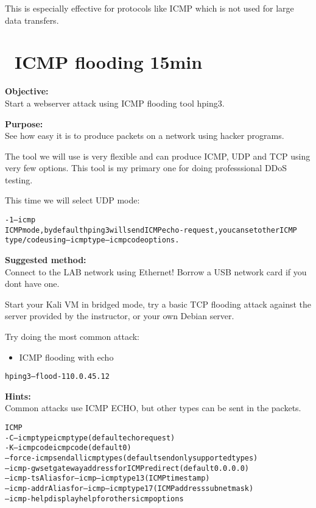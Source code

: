 \documentclass[a4paper,11pt,notitlepage]{report}
\begin{document}
This is especially effective for protocols like ICMP which is not used for large data transfers.

\chapter{\faInfoCircle\ ICMP flooding 15min}

{\bf Objective:}\\
Start a webserver attack using ICMP flooding tool hping3.

{\bf Purpose:}\\
See how easy it is to produce packets on a network using hacker programs.

The tool we will use is very flexible and can produce ICMP, UDP and TCP using very few options. This tool is my primary one for doing professsional DDoS testing.

This time we will select UDP mode:

\begin{alltt}\footnotesize
-1 --icmp
       ICMP  mode,  by  default  hping3  will  send  ICMP echo-request, you can set other ICMP
       type/code using --icmptype --icmpcode options.
\end{alltt}

{\bf Suggested method:}\\
Connect to the LAB network using Ethernet! Borrow a USB network card if you dont have one.

Start your Kali VM in bridged mode, try a basic TCP flooding attack against the server provided by the instructor, or your own Debian server.

Try doing the most common attack:
\begin{itemize}
\item ICMP flooding with echo
\end{itemize}

\begin{alltt}\footnotesize
hping3 --flood -1 10.0.45.12
\end{alltt}





{\bf Hints:}\\
Common attacks use ICMP ECHO, but other types can be sent in the packets.

\begin{alltt}\footnotesize
ICMP
  -C  --icmptype   icmp type (default echo request)
  -K  --icmpcode   icmp code (default 0)
      --force-icmp send all icmp types (default send only supported types)
      --icmp-gw    set gateway address for ICMP redirect (default 0.0.0.0)
      --icmp-ts    Alias for --icmp --icmptype 13 (ICMP timestamp)
      --icmp-addr  Alias for --icmp --icmptype 17 (ICMP address subnet mask)
      --icmp-help  display help for others icmp options
\end{alltt}
\end{document}
